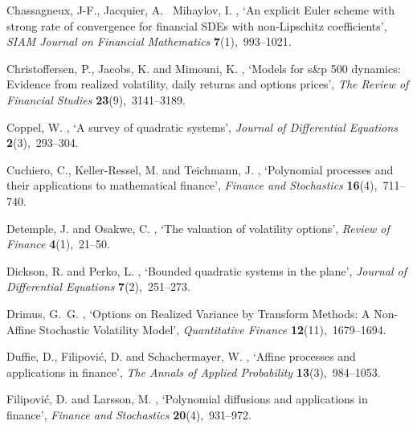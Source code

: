 \documentclass[pdftex,11pt,a4paper] {article}
\begin{document}
\begin{thebibliography}{}
Chassagneux, J-F., Jacquier, A. \harvardand\ Mihaylov, I.  \harvardyearright ,
  `An explicit Euler scheme with strong rate of convergence for financial SDEs with non-Lipschitz coefficients',
  {\em SIAM Journal on Financial Mathematics} {\bf 7}(1),~993--1021.

Christoffersen, P., Jacobs, K. and Mimouni, K.  \harvardyearright , `Models for s\&p 500 dynamics: Evidence from realized
  volatility, daily returns and options prices', {\em The Review of Financial
  Studies} {\bf 23}(9),~3141--3189.

Coppel, W.  \harvardyearright , `A survey of quadratic
  systems', {\em Journal of Differential Equations} {\bf 2}(3),~293--304.


Cuchiero, C., Keller-Ressel, M. and Teichmann, J.  \harvardyearright , `Polynomial processes and their applications to
  mathematical finance', {\em Finance and Stochastics} {\bf 16}(4),~711--740.


Detemple, J. and Osakwe, C.  \harvardyearright ,
  `The valuation of volatility options', {\em Review of Finance} {\bf
  4}(1),~21--50.

Dickson, R. and Perko, L.  \harvardyearright ,
  `Bounded quadratic systems in the plane', {\em Journal of Differential
  Equations} {\bf 7}(2),~251--273.

Drimus, G.~G.  \harvardyearright, `Options on Realized Variance by Transform Methods: A Non-Affine Stochastic Volatility Model',
{\em Quantitative Finance} {\bf 12}(11),~1679--1694.

Duffie, D., Filipovi{\'c}, D. and Schachermayer, W.  \harvardyearright , `Affine processes and applications in finance', {\em
  The Annals of Applied Probability} {\bf 13}(3),~984--1053.


Filipovi{\'c}, D. and Larsson, M.  \harvardyearright , `Polynomial diffusions and applications in finance',
  {\em Finance and Stochastics} {\bf 20}(4),~931--972.


\end{thebibliography}
\end{document}
